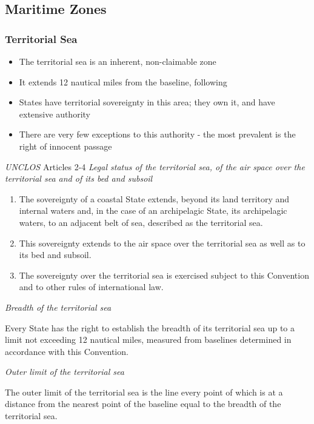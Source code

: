 \subsection{Maritime Zones}
\subsubsection{Territorial Sea}
\begin{itemize}
    \item The territorial sea is an inherent, non-claimable zone
    \item It extends 12 nautical miles from the baseline, following 
    \item States have territorial sovereignty in this area; they own it, and have extensive authority
    \item There are very few exceptions to this authority - the most prevalent is the right of innocent passage
\end{itemize}

\begin{conventiondetails}{\textit{UNCLOS} Articles 2-4}
    \flushleft
    \textit{Legal status of the territorial sea, of the air space over the territorial sea and of its bed and subsoil}
    \begin{enumerate}
        \item The sovereignty of a coastal State extends, beyond its land territory and internal waters and, in the case of an archipelagic State, its archipelagic waters, to an adjacent belt of sea, described as the territorial sea.
        \item This sovereignty extends to the air space over the territorial sea as well as to its bed and subsoil.
        \item The sovereignty over the territorial sea is exercised subject to this Convention and to other rules of international law.
    \end{enumerate}

    \textit{Breadth of the territorial sea}

    \vspace{\baselineskip}

    Every State has the right to establish the breadth of its territorial sea up to a limit not exceeding 12 nautical miles, measured from baselines determined in accordance with this Convention.

    \textit{Outer limit of the territorial sea}

    \vspace{\baselineskip}

    The outer limit of the territorial sea is the line every point of which is at a distance from the nearest point of the baseline equal to the breadth of the territorial sea.
\end{conventiondetails}


